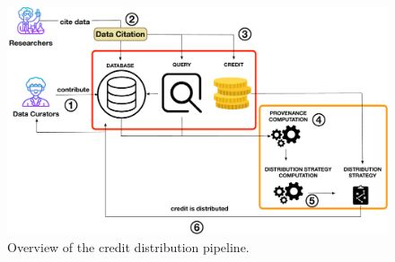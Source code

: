 \begin{figure}[]
    \centering
    \includegraphics[width=.85\textwidth]{figures/overview}
    \caption{Overview of the credit distribution pipeline.}
    \label{fig:system_overview}
\end{figure}

